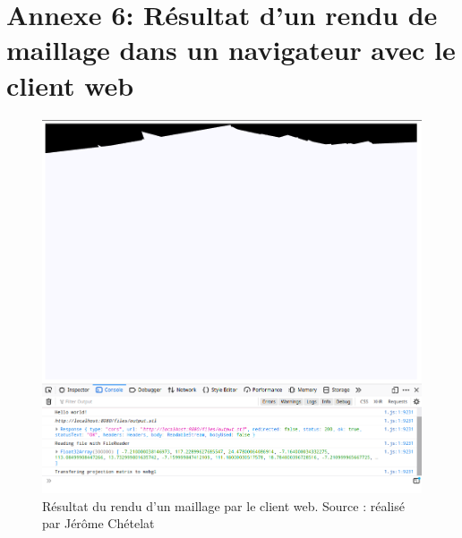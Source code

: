 \chapter*{Annexe 6: Résultat d'un rendu de maillage dans un navigateur avec le client web}

\begin{figure}[htbp!]
    \centering
	\includegraphics[width=0.8\linewidth]{figures/web_client.png}
	\caption{Résultat du rendu d'un maillage par le client web. Source : réalisé par Jérôme Chételat}
	\label{fig:web_client}
\end{figure}

\stopcontents[annexes]
\resumecontents[default]
